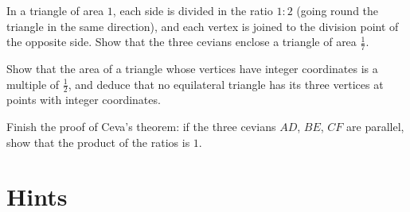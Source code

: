 \begin{exercise}[$\star\star$]\label{geometry:ex:routh}
In a triangle of area $1$, each side is divided in the ratio $1:2$ (going round the triangle in the same direction), and each vertex is
joined to the division point of the opposite side. Show that the three cevians enclose a triangle of area $\frac17$.
\end{exercise}

\begin{exercise}[$\star$]\label{geometry:ex:latticeequilateral}
Show that the area of a triangle whose vertices have integer coordinates is a multiple of $\frac12$, and deduce that no equilateral
triangle has its three vertices at points with integer coordinates.
\end{exercise}

\begin{exercise}[$\star$]\label{geometry:ex:cevaparallel}
Finish the proof of Ceva's theorem: if the three cevians $AD$, $BE$, $CF$ are parallel, show that the product of the ratios is $1$.
\end{exercise}

\section{Hints}

